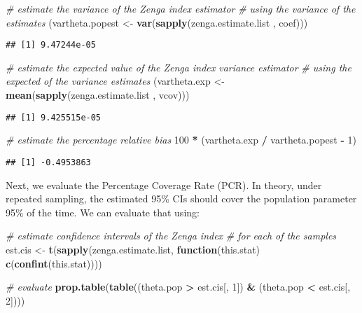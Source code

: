 \documentclass[
]{book}
\newenvironment{Shaded}{\begin{snugshade}}{\end{snugshade}}
\newcommand{\CommentTok}[1]{\textcolor[rgb]{0.56,0.35,0.01}{\textit{#1}}}
\newcommand{\ControlFlowTok}[1]{\textcolor[rgb]{0.13,0.29,0.53}{\textbf{#1}}}
\newcommand{\DecValTok}[1]{\textcolor[rgb]{0.00,0.00,0.81}{#1}}
\newcommand{\FunctionTok}[1]{\textcolor[rgb]{0.13,0.29,0.53}{\textbf{#1}}}
\newcommand{\NormalTok}[1]{#1}
\newcommand{\OtherTok}[1]{\textcolor[rgb]{0.56,0.35,0.01}{#1}}
\newcommand{\SpecialCharTok}[1]{\textcolor[rgb]{0.81,0.36,0.00}{\textbf{#1}}}
\begin{document}
\begin{Shaded}
\begin{Highlighting}[]
\CommentTok{\# estimate the variance of the Zenga index estimator}
\CommentTok{\# using the variance of the estimates}
\NormalTok{(vartheta.popest }\OtherTok{\textless{}{-}} \FunctionTok{var}\NormalTok{(}\FunctionTok{sapply}\NormalTok{(zenga.estimate.list , coef)))}
\end{Highlighting}
\end{Shaded}

\begin{verbatim}
## [1] 9.47244e-05
\end{verbatim}

\begin{Shaded}
\begin{Highlighting}[]
\CommentTok{\# estimate the expected value of the Zenga index variance estimator}
\CommentTok{\# using the expected of the variance estimates}
\NormalTok{(vartheta.exp }\OtherTok{\textless{}{-}} \FunctionTok{mean}\NormalTok{(}\FunctionTok{sapply}\NormalTok{(zenga.estimate.list , vcov)))}
\end{Highlighting}
\end{Shaded}

\begin{verbatim}
## [1] 9.425515e-05
\end{verbatim}

\begin{Shaded}
\begin{Highlighting}[]
\CommentTok{\# estimate the percentage relative bias}
\DecValTok{100} \SpecialCharTok{*}\NormalTok{ (vartheta.exp }\SpecialCharTok{/}\NormalTok{ vartheta.popest }\SpecialCharTok{{-}} \DecValTok{1}\NormalTok{)}
\end{Highlighting}
\end{Shaded}

\begin{verbatim}
## [1] -0.4953863
\end{verbatim}

Next, we evaluate the Percentage Coverage Rate (PCR). In theory, under repeated sampling, the estimated 95\% CIs should cover the population parameter 95\% of the time. We can evaluate that using:

\begin{Shaded}
\begin{Highlighting}[]
\CommentTok{\# estimate confidence intervals of the Zenga index}
\CommentTok{\# for each of the samples}
\NormalTok{est.cis }\OtherTok{\textless{}{-}}
  \FunctionTok{t}\NormalTok{(}\FunctionTok{sapply}\NormalTok{(zenga.estimate.list, }\ControlFlowTok{function}\NormalTok{(this.stat)}
    \FunctionTok{c}\NormalTok{(}\FunctionTok{confint}\NormalTok{(this.stat))))}

\CommentTok{\# evaluate}
\FunctionTok{prop.table}\NormalTok{(}\FunctionTok{table}\NormalTok{((theta.pop }\SpecialCharTok{\textgreater{}}\NormalTok{ est.cis[, }\DecValTok{1}\NormalTok{]) }\SpecialCharTok{\&}
\NormalTok{                   (theta.pop }\SpecialCharTok{\textless{}}\NormalTok{ est.cis[, }\DecValTok{2}\NormalTok{])))}
\end{Highlighting}
\end{Shaded}
\end{document}
